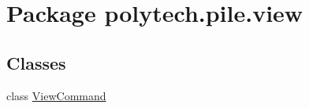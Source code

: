 \hypertarget{namespacepolytech_1_1pile_1_1view}{}\section{Package polytech.\+pile.\+view}
\label{namespacepolytech_1_1pile_1_1view}
\subsection*{Classes}
\begin{DoxyCompactItemize}
\item 
class \hyperlink{classpolytech_1_1pile_1_1view_1_1_view_command}{View\+Command}
\end{DoxyCompactItemize}
